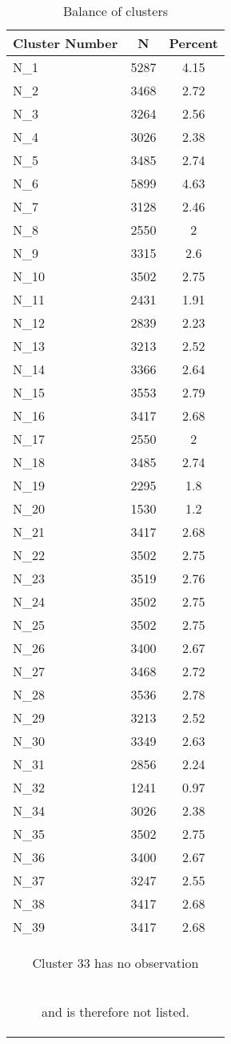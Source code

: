 \documentclass{article}
\begin{document}
\begin{table}[htbp]\centering \caption{Balance of clusters \label{Balance of clusters}}
\begin{tabular}{l c c}\hline\hline
\textbf{Cluster Number} & \textbf{N}
 & \textbf{Percent} \\ \hline
N\_1 & 5287 & 4.15 \\
N\_2 & 3468 & 2.72  \\
N\_3 & 3264 & 2.56 \\
N\_4 & 3026 & 2.38 \\
N\_5 & 3485 & 2.74 \\
N\_6 & 5899 & 4.63 \\
N\_7 & 3128 & 2.46 \\
N\_8 & 2550 & 2   \\
N\_9 & 3315 & 2.6  \\
N\_10 & 3502 & 2.75\\
N\_11 & 2431 & 1.91\\
N\_12 & 2839 & 2.23\\
N\_13 & 3213 & 2.52\\
N\_14 & 3366 & 2.64\\
N\_15 & 3553 & 2.79\\
N\_16 & 3417 & 2.68\\
N\_17 & 2550 & 2  \\
N\_18 & 3485 & 2.74 \\
N\_19 & 2295 & 1.8  \\
N\_20 & 1530 & 1.2  \\
N\_21 & 3417 & 2.68 \\
N\_22 & 3502 & 2.75 \\
N\_23 & 3519 & 2.76 \\
N\_24 & 3502 & 2.75 \\
N\_25 & 3502 & 2.75 \\
N\_26 & 3400 & 2.67 \\
N\_27 & 3468 & 2.72 \\
N\_28 & 3536 & 2.78 \\
N\_29 & 3213 & 2.52 \\
N\_30 & 3349 & 2.63 \\
N\_31 & 2856 & 2.24 \\
N\_32 & 1241 & 0.97 \\
N\_34 & 3026 & 2.38\\
N\_35 & 3502 & 2.75\\
N\_36 & 3400 & 2.67\\
N\_37 & 3247 & 2.55\\
N\_38 & 3417 & 2.68\\
N\_39 & 3417 & 2.68 \\ \hline
\multicolumn{3}{c}{\begin{footnotesize} Cluster 33 has no observation \end{footnotesize}} \\
\multicolumn{3}{c}{\begin{footnotesize}  and is therefore not listed.
\end{footnotesize}}
\end{tabular}
\end{table}
\end{document}

